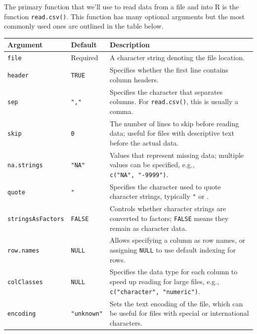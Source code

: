 \documentclass[
  letterpaper,
  DIV=11,
  numbers=noendperiod]{scrreprt}
\begin{document}
The primary function that we'll use to read data from a file and into R
is the function \texttt{read.csv()}. This function has many optional
arguments but the most commonly used ones are outlined in the table
below.

\begin{longtable}[]{@{}
  >{\raggedright\arraybackslash}p{}
  >{\raggedright\arraybackslash}p{}
  >{\raggedright\arraybackslash}p{}@{}}
\toprule\noalign{}
\begin{minipage}[b]{\linewidth}\raggedright
Argument
\end{minipage} & \begin{minipage}[b]{\linewidth}\raggedright
Default
\end{minipage} & \begin{minipage}[b]{\linewidth}\raggedright
Description
\end{minipage} \\
\midrule\noalign{}
\endhead
\bottomrule\noalign{}
\endlastfoot
\texttt{file} & Required & A character string denoting the file
location. \\
\texttt{header} & \texttt{TRUE} & Specifies whether the first line
contains column headers. \\
\texttt{sep} & \texttt{","} & Specifies the character that separates
columns. For \texttt{read.csv()}, this is usually a comma. \\
\texttt{skip} & \texttt{0} & The number of lines to skip before reading
data; useful for files with descriptive text before the actual data. \\
\texttt{na.strings} & \texttt{"NA"} & Values that represent missing
data; multiple values can be specified, e.g.,
\texttt{c("NA",\ "-9999")}. \\
\texttt{quote} & \texttt{"} & Specifies the character used to quote
character strings, typically \texttt{"} or
\texttt{\textquotesingle{}}. \\
\texttt{stringsAsFactors} & \texttt{FALSE} & Controls whether character
strings are converted to factors; \texttt{FALSE} means they remain as
character data. \\
\texttt{row.names} & \texttt{NULL} & Allows specifying a column as row
names, or assigning \texttt{NULL} to use default indexing for rows. \\
\texttt{colClasses} & \texttt{NULL} & Specifies the data type for each
column to speed up reading for large files, e.g.,
\texttt{c("character",\ "numeric")}. \\
\texttt{encoding} & \texttt{"unknown"} & Sets the text encoding of the
file, which can be useful for files with special or international
characters. \\
\end{longtable}
\end{document}
